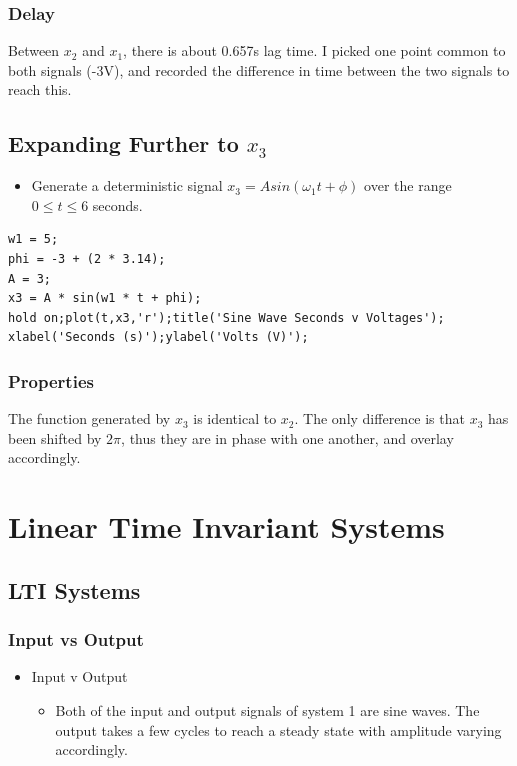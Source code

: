 \documentclass[12pt]{article}
\begin{document}
\subsubsection{Delay}
Between $x_2$ and $x_1$, there is about 0.657s lag time. I picked one point common to both signals (-3V), and recorded the difference in time between the two signals to reach this. 

\subsection{Expanding Further to $x_3$}
\begin{itemize}
\item Generate a deterministic signal $x_3=Asin(\omega_{1}t + \phi)$ over the range $0 \leq t \leq 6$ seconds.
\end{itemize}

\begin{lstlisting}
w1 = 5;
phi = -3 + (2 * 3.14);
A = 3;
x3 = A * sin(w1 * t + phi);
hold on;plot(t,x3,'r');title('Sine Wave Seconds v Voltages');
xlabel('Seconds (s)');ylabel('Volts (V)');
\end{lstlisting}

\subsubsection{Properties}
The function generated by $x_3$ is identical to $x_2$. The only difference is that $x_3$ has been shifted by $2\pi$, thus they are in phase with one another, and overlay accordingly.
\section{Linear Time Invariant Systems}
\subsection{LTI Systems}
\subsubsection{Input vs Output}
\begin{itemize}
\item Input v Output
\begin{itemize}
\item Both of the input and output signals of system 1 are sine waves. The output takes a few cycles to reach a steady state with amplitude varying accordingly.
\end{itemize}
\end{itemize}
\end{document}
